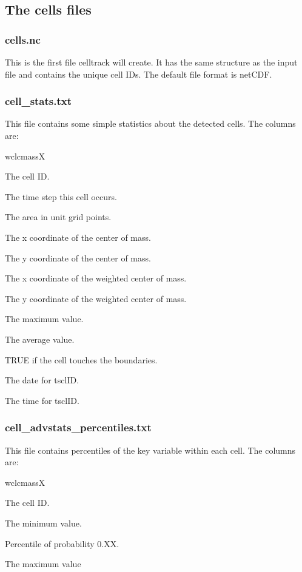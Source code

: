 \documentclass{scrartcl}
\begin{document}
\subsection{The cells files}
\subsubsection{cells.nc}
This is the first file celltrack will create. It has the same structure as the input file and contains the unique cell IDs. The default file format is netCDF.

\subsubsection{cell\_stats.txt}
This file contains some simple statistics about the detected cells. The columns are:
\begin{labeling}{wclcmassX}
	\item[clID] The cell ID.
	\item[tsclID] The time step this cell occurs.
	\item[clarea] The area in unit grid points.
	\item[clcmassX] The x coordinate of the center of mass.
	\item[clcmassY] The y coordinate of the center of mass.
	\item[wclcmassX] The x coordinate of the weighted center of mass.
	\item[wclcmassY] The y coordinate of the weighted center of mass.
	\item[peakVal] The maximum value.
	\item[avVal] The average value.
	\item[touchb] TRUE if the cell touches the boundaries.
    \item[date] The date for tsclID.
    \item[time] The time for tsclID.
\end{labeling}

\subsubsection{cell\_advstats\_percentiles.txt}
This file contains percentiles of the key variable within each cell. The columns are:
\begin{labeling}{wclcmassX}
	\item[clID] The cell ID.
	\item[MIN] The minimum value.
	\item[0.XX] Percentile of probability 0.XX.
	\item[MAX] The maximum value
\end{labeling}
\end{document}
